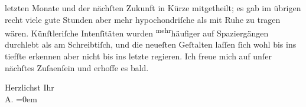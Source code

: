                letzten Monate und der nächſten Zukunft in Kürze mitgetheilt; es gab im übrigen recht
               viele gute Stunden aber mehr hypochondriſche als mit Ruhe zu tragen wären.
               Künſtleriſche Intenſitäten wurden \substVorne{}\textsuperscript{mehr}\substDazwischen{}häufiger\substHinten{} auf Spaziergängen durchlebt als am Schreibtiſch, und die neueſten Geſtalten
               laſſen{ }ſich wohl bis ins tiefſte erkennen aber nicht bis ins letzte regieren. Ich
               freue mich auf unſer nächſtes Zuſa{\geminationm}enſein und erhoffe es
               bald.\pend
           
\pstart
           Herzlichst Ihr{\\[\baselineskip]}\spacefill\mbox{A.}\pend
           \leftskip=0em{}\endnumbering{}  \newcommand{\dateiname}{L01625}\newcommand{\titel}{Arthur Schnitzler an Hugo von Hofmannsthal, 8. 9. 1906}\newcommand{\editorInnen}{Martin Anton Müller und Gerd-Hermann Susen}
